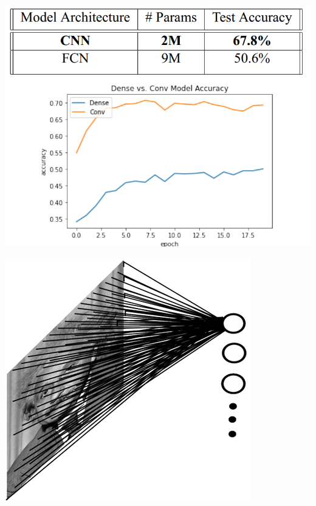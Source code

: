 \documentclass[default, aspectratio=169]{beamer}
\begin{document}
	\begin{frame}
		\centering
		\begin{minipage}{0.5\textwidth}
			\centering
			\includegraphics[keepaspectratio, scale=0.55]{pic/param.png}
		\end{minipage}
		\hfill
		\begin{minipage}{0.4\textwidth}
			\centering
			\includegraphics[keepaspectratio, scale=0.4]{pic/FCN.png} \\
			\vspace{0.3cm} %

\end{minipage}
\end{frame}
\end{document}
